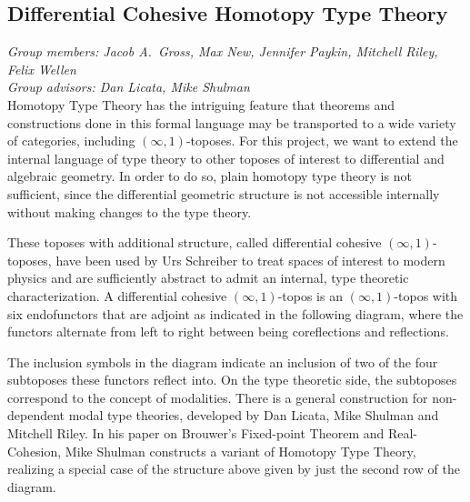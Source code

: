 \documentclass[a4paper,12pt]{article}
\newcommand{\Red}{\Re}
\newcommand{\Cored}{\Im}
\newcommand{\Wat}{\&}
\newcommand{\shape}{\ensuremath{\mathord{\raisebox{0.5pt}{\text{\rm\esh}}}}}
\newcommand{\submodality}{\rotatebox[origin=c]{90}{$\subset$}}
\begin{document}
\subsection*{Differential Cohesive Homotopy Type Theory}

\emph{Group members: Jacob A.\ Gross, Max New, Jennifer Paykin, Mitchell Riley, Felix Wellen} \\
\emph{Group advisors: Dan Licata, Mike Shulman} \\

Homotopy Type Theory has the intriguing feature that theorems and constructions done in this formal language
may be transported to a wide variety of categories, including $(\infty,1)$-toposes.
For this project, we want to extend the internal language of type theory to other toposes of interest to differential and algebraic geometry. In order to do so, plain homotopy type theory is not sufficient, since the differential geometric structure 
is not accessible internally without making changes to the type theory.

These toposes with additional structure, called differential cohesive $(\infty,1)$-toposes, have been used by Urs Schreiber to treat spaces of interest to modern physics
and are sufficiently abstract to admit an internal, type theoretic characterization. 
A differential cohesive $(\infty,1)$-topos is an $(\infty,1)$-topos with six endofunctors that are adjoint as indicated in the following diagram,
where the functors alternate from left to right between being coreflections and reflections.
\begin{center}
\end{center}
The inclusion symbols in the diagram indicate an inclusion of two of the four subtoposes these functors reflect into.
On the type theoretic side, the subtoposes correspond to the concept of modalities.
There is a general construction for non-dependent modal type theories, developed by Dan Licata, Mike Shulman and Mitchell Riley. 
In his paper on Brouwer's Fixed-point Theorem and Real-Cohesion, Mike Shulman constructs a variant of Homotopy Type Theory, 
realizing a special case of the structure above given by just the second row of the diagram.
\end{document}
